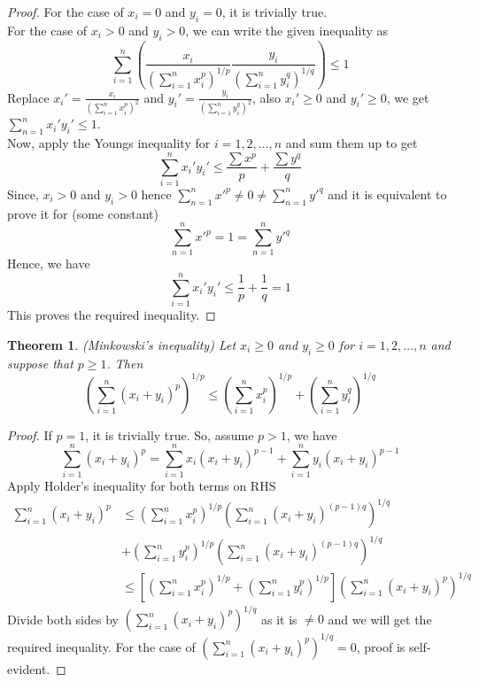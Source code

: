 \documentclass[12pt]{report}
\newtheorem{thm}{Theorem}
\begin{document}
\begin{proof}
    For the case of $x_i = 0$ and $y_i = 0$, it is trivially true.\\
    For the case of $x_i > 0$ and $y_i > 0$, we can write the given inequality as 
    $$ \sum\limits_{i = 1}^{n} \left(\frac{x_i}{\left(\sum\limits_{i = 1}^{n} x_i^p\right)^{1/p}} \frac{y_i}{\left(\sum\limits_{i = 1}^{n} y_i^q\right)^{1/q}} \right)\leq 1 $$
    Replace $ x_i' = \frac{x_i}{\left(\sum\limits_{i = 1}^{n} x_i^p\right)^2}$ and $y_i' = \frac{y_i}{\left(\sum\limits_{i = 1}^{n} y_i^q\right)^2} $, also $x_i' \geq 0$ and $y_i' \geq 0$, we get $ \sum\limits_{n = 1}^{n} x_i'y_i' \leq 1$. \\
    Now,  apply the Youngs inequality for $i = 1, 2, \dots, n$ and sum them up to get
    $$ \sum\limits_{i = 1}^{n} x_i'y_i' \leq \frac{\sum x^p}{p} + \frac{\sum y^q}{q}$$
    Since, $x_i > 0$ and $y_i > 0$ hence $\sum\limits_{n=1}^{n}x'^p \neq 0 \neq \sum\limits_{n=1}^{n}y'^q $ and it is equivalent to prove it for (some constant)
    $$ \sum\limits_{n=1}^{n}x'^p = 1 = \sum\limits_{n=1}^{n}y'^q $$
    Hence, we have
    $$ \sum\limits_{i = 1}^{n} x_i'y_i' \leq \frac{1}{p} + \frac{1}{q} = 1$$
    This proves the required inequality.
\end{proof}
\begin{thm}
    (Minkowski's inequality) Let $x_i \geq 0$ and $y_i \geq 0$ for $ i = 1,2,\dots, n$ and suppose that $p \geq 1$. Then
    $$ \left(\sum\limits_{i =1}^n(x_i + y_i)^p\right)^{1/p} \leq \left(\sum\limits_{i =1}^nx_i^p\right)^{1/p} + \left(\sum\limits_{i =1}^ny_i^q\right)^{1/q}$$  
\end{thm}
\begin{proof}
    If $p = 1$, it is trivially true. So, assume $p > 1$, we have
    $$ \sum\limits_{i=1}^n(x_i + y_i)^p = \sum\limits_{i=1}^{n} x_i(x_i + y_i)^{p-1} + \sum\limits_{i = 1}^n y_i(x_i + y_i)^{p-1}$$
    Apply Holder's inequality for both terms on RHS
    \begin{align*}
        \sum\limits_{i=1}^n(x_i + y_i)^p &\leq \left(\sum\limits_{i=1}^n x_i^p \right)^{1/p} \left(\sum\limits_{i=1}^n (x_i + y_i)^{(p-1)q}\right)^{1/q} \\
        &+ \left(\sum\limits_{i=1}^n y_i^p \right)^{1/p} \left(\sum\limits_{i=1}^n (x_i + y_i)^{(p-1)q}\right)^{1/q}\\
        &\leq \left[\left(\sum\limits_{i=1}^n x_i^p\right)^{1/p} + \left(\sum\limits_{i=1}^n y_i^p\right)^{1/p}\right] \left(\sum\limits_{i=1}^n(x_i + y_i)^p\right)^{1/q}
    \end{align*}
    Divide both sides by $\left(\sum\limits_{i=1}^n(x_i + y_i)^p\right)^{1/q}$ as it is $\neq 0$ and we will get the required inequality. For the case of $\left(\sum\limits_{i=1}^n(x_i + y_i)^p\right)^{1/q} = 0$, proof is self-evident. 
\end{proof}
\end{document}
